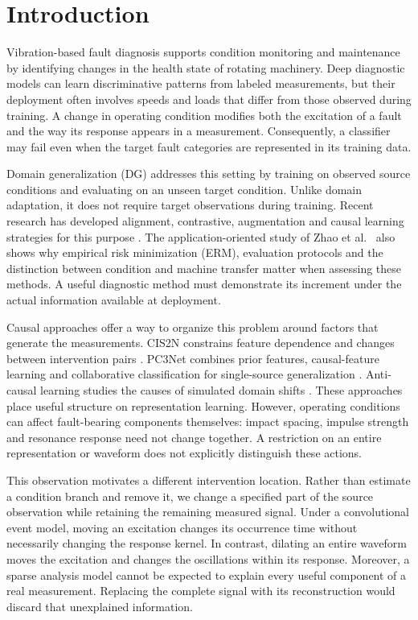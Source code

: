 \documentclass[a4paper,fleqn]{cas-sc}
\begin{document}
\section{Introduction}
Vibration-based fault diagnosis supports condition monitoring and maintenance by identifying changes in the health state of rotating machinery. Deep diagnostic models can learn discriminative patterns from labeled measurements, but their deployment often involves speeds and loads that differ from those observed during training. A change in operating condition modifies both the excitation of a fault and the way its response appears in a measurement. Consequently, a classifier may fail even when the target fault categories are represented in its training data.

Domain generalization (DG) addresses this setting by training on observed source conditions and evaluating on an unseen target condition. Unlike domain adaptation, it does not require target observations during training. Recent research has developed alignment, contrastive, augmentation and causal learning strategies for this purpose \cite{zhao2024,chen2025}. The application-oriented study of Zhao et al.~\cite{zhao2024} also shows why empirical risk minimization (ERM), evaluation protocols and the distinction between condition and machine transfer matter when assessing these methods. A useful diagnostic method must demonstrate its increment under the actual information available at deployment.

Causal approaches offer a way to organize this problem around factors that generate the measurements. CIS2N constrains feature dependence and changes between intervention pairs \cite{cis2n}. PC3Net combines prior features, causal-feature learning and collaborative classification for single-source generalization \cite{pc3net}. Anti-causal learning studies the causes of simulated domain shifts \cite{antic2024}. These approaches place useful structure on representation learning. However, operating conditions can affect fault-bearing components themselves: impact spacing, impulse strength and resonance response need not change together. A restriction on an entire representation or waveform does not explicitly distinguish these actions.

This observation motivates a different intervention location. Rather than estimate a condition branch and remove it, we change a specified part of the source observation while retaining the remaining measured signal. Under a convolutional event model, moving an excitation changes its occurrence time without necessarily changing the response kernel. In contrast, dilating an entire waveform moves the excitation and changes the oscillations within its response. Moreover, a sparse analysis model cannot be expected to explain every useful component of a real measurement. Replacing the complete signal with its reconstruction would discard that unexplained information.
\end{document}
